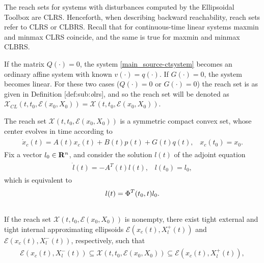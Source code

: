 \documentclass[letterpaper,10pt,english]{sphinxmanual}
\begin{document}
The reach sets for systems with disturbances computed by the Ellipsoidal
Toolbox are CLRS. Henceforth, when describing backward reachability,
reach sets refer to CLRS or CLBRS. Recall that for continuous-time
linear systems maxmin and minmax CLRS coincide, and the same is true for
maxmin and minmax CLBRS.

If the matrix $Q(\cdot)=0$, the system \eqref{main_source-ctsystem} becomes an
ordinary affine system with known $v(\cdot)=q(\cdot)$. If
$G(\cdot) = 0$, the system becomes linear. For these two cases
($Q(\cdot)=0$ or $G(\cdot)=0$) the reach set is as given in
Definition {[}def:sub:\emph{o}lrs{]}, and so the reach set will be denoted as
${\mathcal X}_{CL}(t, t_0, {\mathcal E}(x_0, X_0)) = {\mathcal X}(t, t_0, {\mathcal E}(x_0,X_0))$.

The reach set ${\mathcal X}(t,t_0,{\mathcal E}(x_0,X_0))$ is a
symmetric compact convex set, whose center evolves in time according to
\label{main_source:equation-fwdcenter}\begin{gather}
\begin{split}\dot{x}_c(t) = A(t)x_c(t) + B(t)p(t) + G(t)q(t), \;\;\;
x_c(t_0)=x_0.\end{split}\label{main_source-fwdcenter}
\end{gather}
Fix a vector $l_0\in{\bf R}^n$, and consider the solution
$l(t)$ of the adjoint equation
\label{main_source:equation-adjointct}\begin{gather}
\begin{split}\dot{l}(t) = -A^T(t)l(t), \;\;\; l(t_0) = l_0,\end{split}\label{main_source-adjointct}
\end{gather}
which is equivalent to
\begin{gather}
\begin{split}l(t) = \Phi^T(t_0, t)l_0.\end{split}\notag\\\begin{split}\end{split}\notag
\end{gather}
If the reach set ${\mathcal X}(t, t_0, {\mathcal E}(x_0,X_0))$ is
nonempty, there exist tight external and tight internal approximating
ellipsoids ${\mathcal E}(x_c(t), X^+_l(t))$ and
${\mathcal E}(x_c(t), X^-_l(t))$, respectively, such that
\label{main_source:equation-fwdinclusion}\begin{gather}
\begin{split}{\mathcal E}(x_c(t), X^-_l(t))\subseteq{\mathcal X}(t,t_0,{\mathcal E}(x_0,X_0))
\subseteq {\mathcal E}(x_c(t), X^+_l(t)),\end{split}\label{main_source-fwdinclusion}
\end{gather}
\end{document}
